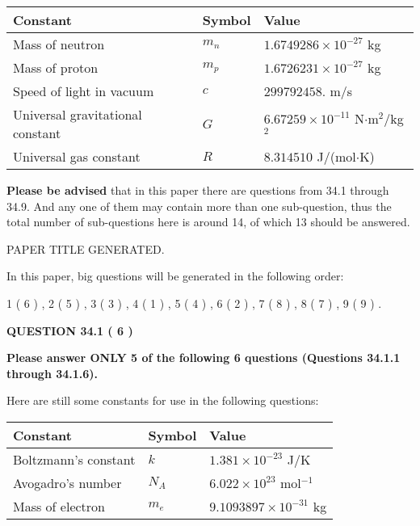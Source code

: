 \documentclass[12pt]{article}
\begin{document}
 
\noindent\begin{tabular}{|l|l|l|}
\hline
Constant & Symbol & Value \\
\hline
Mass of neutron &
$m_n$ &
 $ 1.6749286 \times 10^{-27} $
kg \\
\hline
Mass of proton &
$m_p$ &
 $ 1.6726231 \times 10^{-27} $
kg \\
\hline
Speed of light in vacuum &
$c$ &
 $ 299792458. $
m/s \\
\hline
Universal gravitational constant &
$G$ &
 $ 6.67259 \times 10^{-11} $
N$\cdot $m$^2$/kg$^2$ \\
\hline
Universal gas constant &
$R$ &
 $ 8.314510 $
J/(mol$\cdot $K) \\
\hline
\end{tabular}
 
 
{\textbf{\large{Please be advised}}} that in this paper there are questions from
34.1 through
34.9.
And any one of them may contain more than one sub-question, thus the total number
of sub-questions here is around 14, of which
13 should be answered.
 
\vspace{0.3in}
 
 
   
   
 PAPER TITLE GENERATED.
   
   
   
\vspace{0.2in}
   
In this paper, big questions will be generated in the following order: 
   
   
             1 (           6 )
 ,
             2 (           5 )
 ,
             3 (           3 )
 ,
             4 (           1 )
 ,
             5 (           4 )
 ,
             6 (           2 )
 ,
             7 (           8 )
 ,
             8 (           7 )
 ,
             9 (           9 )
 .
  
\vspace{0.2in}
  
{\textbf{\Large{QUESTION
34.1 
 (           6 )
}}}
  
  
 
{\textbf{\Large{Please answer ONLY
5 of the following
6 questions (Questions
34.1.1 through
34.1.6). }}}
 
Here are still some constants for use in the following questions:
 
 
\noindent\begin{tabular}{|l|l|l|}
\hline
Constant & Symbol & Value \\
\hline
 
Boltzmann's constant &
$k$ &
 $ 1.381 \times 10^{-23} $
J/K \\
\hline
 
Avogadro's number &
$N_A$ &
 $ 6.022 \times 10^{23} $
mol$^{-1}$ \\
\hline
 
Mass of electron &
$m_e$ &
 $ 9.1093897 \times 10^{-31} $
kg \\
\hline
 
\end{tabular}
 
\end{document}
